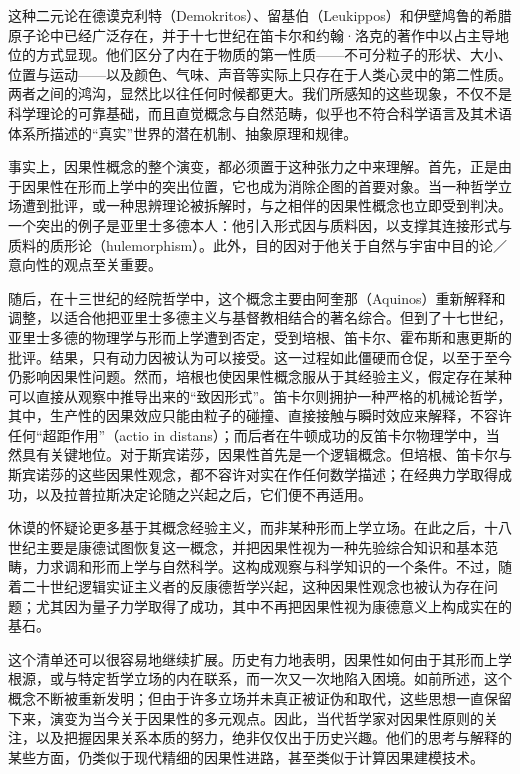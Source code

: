 这种二元论在德谟克利特（Demokritos）、留基伯（Leukippos）和伊壁鸠鲁的希腊原子论中已经广泛存在，并于十七世纪在笛卡尔和约翰·洛克的著作中以占主导地位的方式显现。他们区分了内在于物质的第一性质——不可分粒子的形状、大小、位置与运动——以及颜色、气味、声音等实际上只存在于人类心灵中的第二性质。两者之间的鸿沟，显然比以往任何时候都更大。我们所感知的这些现象，不仅不是科学理论的可靠基础，而且直觉概念与自然范畴，似乎也不符合科学语言及其术语体系所描述的“真实”世界的潜在机制、抽象原理和规律。

事实上，因果性概念的整个演变，都必须置于这种张力之中来理解。首先，正是由于因果性在形而上学中的突出位置，它也成为消除企图的首要对象。当一种哲学立场遭到批评，或一种思辨理论被拆解时，与之相伴的因果性概念也立即受到判决。一个突出的例子是亚里士多德本人：他引入形式因与质料因，以支撑其连接形式与质料的质形论（hulemorphism）。此外，目的因对于他关于自然与宇宙中目的论／意向性的观点至关重要。

随后，在十三世纪的经院哲学中，这个概念主要由阿奎那（Aquinos）重新解释和调整，以适合他把亚里士多德主义与基督教相结合的著名综合。但到了十七世纪，亚里士多德的物理学与形而上学遭到否定，受到培根、笛卡尔、霍布斯和惠更斯的批评。结果，只有动力因被认为可以接受。这一过程如此僵硬而仓促，以至于至今仍影响因果性问题。然而，培根也使因果性概念服从于其经验主义，假定存在某种可以直接从观察中推导出来的“致因形式”。笛卡尔则拥护一种严格的机械论哲学，其中，生产性的因果效应只能由粒子的碰撞、直接接触与瞬时效应来解释，不容许任何“超距作用”（actio in distans）；而后者在牛顿成功的反笛卡尔物理学中，当然具有关键地位。对于斯宾诺莎，因果性首先是一个逻辑概念。但培根、笛卡尔与斯宾诺莎的这些因果性观念，都不容许对实在作任何数学描述；在经典力学取得成功，以及拉普拉斯决定论随之兴起之后，它们便不再适用。

休谟的怀疑论更多基于其概念经验主义，而非某种形而上学立场。在此之后，十八世纪主要是康德试图恢复这一概念，并把因果性视为一种先验综合知识和基本范畴，力求调和形而上学与自然科学。这构成观察与科学知识的一个条件。不过，随着二十世纪逻辑实证主义者的反康德哲学兴起，这种因果性观念也被认为存在问题；尤其因为量子力学取得了成功，其中不再把因果性视为康德意义上构成实在的基石。

这个清单还可以很容易地继续扩展。历史有力地表明，因果性如何由于其形而上学根源，或与特定哲学立场的内在联系，而一次又一次地陷入困境。如前所述，这个概念不断被重新发明；但由于许多立场并未真正被证伪和取代，这些思想一直保留下来，演变为当今关于因果性的多元观点。因此，当代哲学家对因果性原则的关注，以及把握因果关系本质的努力，绝非仅仅出于历史兴趣。他们的思考与解释的某些方面，仍类似于现代精细的因果性进路，甚至类似于计算因果建模技术。

